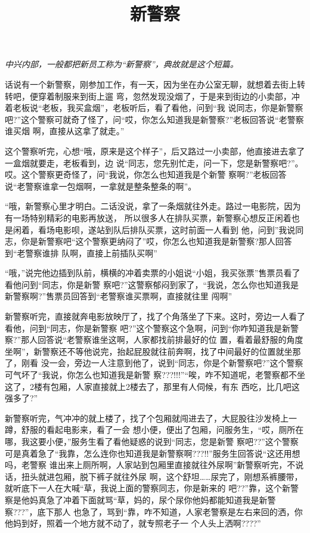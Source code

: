 \documentclass[11pt,a4paper,onecolumn]{article}
\title{新警察}
\author{}
\date{}
\begin{document}
\pagestyle{fancy}

\textit{中兴内部，一般都把新员工称为``新警察''，典故就是这个短篇。}

话说有一个新警察，刚参加工作，有一天，因为坐在办公室无聊，就想着去街上转转吧，便穿着制服来到街上遛
弯，忽然发现没烟了，于是来到街边的小卖部，冲着老板说``老板，我买盒烟''，老板听后，看了看他，问到``我
说同志，你是新警察吧?''这个警察可就奇了怪了，问``哎，你怎么知道我是新警察?''老板回答说``老警察谁买烟
啊，直接从这拿了就走。''

这个警察听完，心想``哦，原来是这个样子''，后又路过一小卖部，他直接进去拿了一盒烟就要走，老板看到，边
说``同志，您先别忙走，问一下，您是新警察吧?''。哎。这个警察更奇怪了，问``我说，你怎么也知道我是个新警
察啊?''老板回答说``老警察谁拿一包烟啊，一拿就是整条整条的啊''。

``哦，新警察心里才明白。二话没说，拿了一条烟就往外走。路过一电影院，因为有一场特别精彩的电影再放送，
所以很多人在排队买票，新警察心想反正闲着也是闲着，看场电影呗，遂站到队后排队买票，这时前面一人看到
他，问到''我说同志，你是新警察吧``这个警察更纳闷了''哎，你怎么也知道我是新警察?那人回答到``老警察谁排
队啊，直接上前插队买啊''

``哦，''说完他边插到队前，横横的冲着卖票的小姐说``小姐，我买张票''售票员看了看他问到``同志，你是新警
察吧?''这警察郁闷到家了，``我说，怎么你也知道我是新警察啊?''售票员回答到``老警察谁买票啊，直接就往里
闯啊''

新警察听完，直接就奔电影放映厅了，找了个角落坐了下来。这时，旁边一人看了看他，问到``同志，你是新警察
吧?''这个警察这个急啊，问到``你咋知道我是新警察?''那人回答说``老警察谁坐这啊，人家都找前排最好的位
置，看着最舒服的角度坐啊''，新警察还不等他说完，抬起屁股就往前奔啊，找了中间最好的位置就坐那了，刚看
没一会，旁边一人注意到他了，说到``同志，你是个新警察吧?''这个警察可气坏了``我说，你怎么也知道我是新警
察???!!!''``唉，咋不知道呢，老警察都不坐这了，2楼有包厢，人家直接就上2楼去了，那里有人伺候，有东
西吃，比几吧这强多了?''

新警察听完，气冲冲的就上楼了，找了个包厢就闯进去了，大屁股往沙发椅上一蹲，舒服的看起电影来，看了一会
想小便，便出了包厢，问服务生，``哎，厕所在哪，我这要小便，''服务生看了看他疑惑的说到``同志，您是新警
察吧??''这个警察可是真着急了``我靠，怎么连你也知道我是新警察啊???!!''服务生回答说``这还用想吗，老警察
谁出来上厕所啊，人家站到包厢里直接就往外尿啊''新警察听完，不说话，扭头就进包厢，脱下裤子就往外尿
啊，这个舒坦……尿完了，刚想系裤腰带，就听底下一人在大喊``草，我说上面的警察同志，你是新来的
吧??''靠，这个新警察是他妈真急了冲着下面就骂``草，妈的，尿个尿你他妈都能知道我是新警察???''，底下那人
也急了，骂到``靠，咋不知道，人家老警察是左右来回的洒，你他妈到好，照着一个地方就不动了，就专照老子一
个人头上洒啊????''
\end{document}
